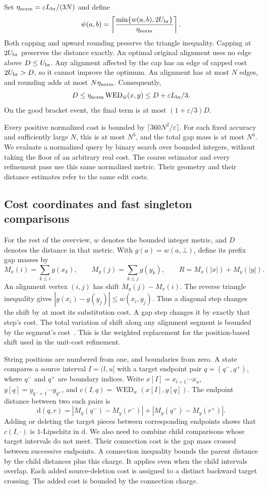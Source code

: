 \documentclass[11pt]{article}
\theoremstyle{definition}
\newcommand{\WED}{\operatorname{WED}}
\newcommand{\dd}{\mathrm d}
\newcommand{\gap}{\bot}
\newcommand{\1}{\mathbf 1}
\begin{document}
Set $\eta_{\rm norm}=\varepsilon L_{\rm br}/(3N)$ and define
\[
 \bar w(a,b)=
 \left\lceil
 \frac{\min\{w(a,b),2U_{\rm br}\}}{\eta_{\rm norm}}
 \right\rceil.
\]
Both capping and upward rounding preserve the triangle inequality.
Capping at $2U_{\rm br}$ preserves the distance exactly.
An optimal original alignment uses no edge above $D\le U_{\rm br}$.
Any alignment affected by the cap has an edge of capped cost
$2U_{\rm br}>D$, so it cannot improve the optimum.
An alignment has at most $N$ edges, and rounding adds at most
$N\eta_{\rm norm}$. Consequently,
\[
 D\le\eta_{\rm norm}\WED_{\bar w}(x,y)
 \le D+\varepsilon L_{\rm br}/3.
\]
On the good bracket event, the final term is at most
$(1+\varepsilon/3)D$.

Every positive normalized cost is bounded by
$\lceil360N^2/\varepsilon\rceil$.
For each fixed accuracy and sufficiently large $N$, this is at most
$N^3$, and the total gap mass is at most $N^4$.
We evaluate a normalized query by binary search over bounded integers,
without taking the floor of an arbitrary real cost.
The coarse estimator and every refinement pass use this same
normalized metric. Their geometry and their distance estimates refer
to the same edit costs.

\subsection{Cost coordinates and fast singleton comparisons}

For the rest of the overview, $w$ denotes the bounded integer metric,
and $D$ denotes the distance in that metric.
With $g(a)=w(a,\gap)$, define its prefix gap masses by
\[
 M_x(i)=\sum_{k\le i}g(x_k),\qquad
 M_y(j)=\sum_{k\le j}g(y_k),\qquad
 R=M_x(|x|)+M_y(|y|).
\]
An alignment vertex $(i,j)$ has shift $M_y(j)-M_x(i)$.
The reverse triangle inequality gives
$|g(x_i)-g(y_j)|\le w(x_i,y_j)$.
Thus a diagonal step changes the shift by at most its substitution cost.
A gap step changes it by exactly that step's cost.
The total variation of shift along any alignment segment is bounded
by the segment's cost~\cite{dkk}.
This is the weighted replacement for the position-based shift used in
the unit-cost refinement.

String positions are numbered from one, and boundaries from zero.
A state compares a source interval $I=(l,u]$ with a target endpoint pair
$q=(q^-,q^+)$, where $q^-$ and $q^+$ are boundary indices.
Write $x[I]=x_{l+1}\cdots x_u$,
$y[q]=y_{q^-+1}\cdots y_{q^+}$, and
$c(I,q)=\WED_w(x[I],y[q])$.
The endpoint distance between two such pairs is
\[
 \dd(q,r)=
 |M_y(q^-)-M_y(r^-)|+|M_y(q^+)-M_y(r^+)|.
\]
Adding or deleting the target pieces between corresponding endpoints
shows that $c(I,\cdot)$ is $1$-Lipschitz in $\dd$.
We also need to combine child comparisons whose target intervals do
not meet. Their connection cost is the gap mass crossed between
successive endpoints. A connection inequality bounds the parent
distance by the child distances plus this charge.
It applies even when the child intervals overlap.
Each added source-deletion cost is assigned to a distinct backward
target crossing. The added cost is bounded by the connection charge.
\end{document}
